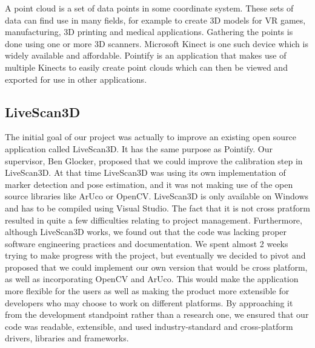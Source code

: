 \documentclass{article}
\begin{document}
A point cloud is a set of data points in some coordinate system. These sets of data can find use in many fields,
for example to create 3D models for VR games, manufacturing, 3D printing and medical applications.
Gathering the points is done using one or more 3D scanners. Microsoft Kinect is one such device which
is widely available and affordable. Pointify is an application that makes use of multiple Kinects to easily
create point clouds which can then be viewed and exported for use in other applications.

\subsection{LiveScan3D}

The initial goal of our project was actually to improve an existing open source application called LiveScan3D.
It has the same purpose as Pointify. Our supervisor, Ben Glocker, proposed that we could
improve the calibration step in LiveScan3D. At that time LiveScan3D was using its own implementation
of marker detection and pose estimation, and it was not making use of the open source libraries like
ArUco or OpenCV. LiveScan3D is only available on Windows and has to be compiled using Visual Studio.
The fact that it is not cross pratform resulted in quite a few difficulties relating to project management.
Furthermore, although LiveScan3D works, we found out that the code was lacking proper software engineering
practices and documentation. We spent almost 2 weeks trying to make progress with the project, but eventually
we decided to pivot and proposed that we could implement our own version that would be cross platform, as well
as incorporating OpenCV and ArUco. This would make the application more flexible for the users
as well as making the product more extensible for developers who may choose to work on different platforms.
By approaching it from the development standpoint rather than a research one, we ensured that our code was readable,
extensible, and used industry-standard and cross-platform drivers, libraries and frameworks.
\end{document}
